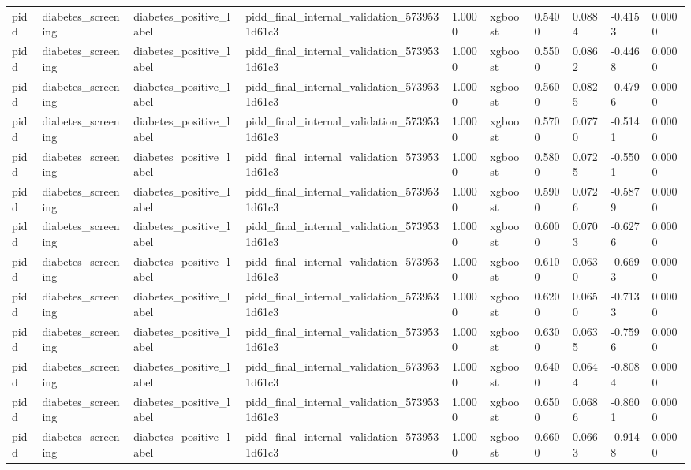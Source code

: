 \begin{tabular}{llllllllll}
pidd & diabetes\_screening & diabetes\_positive\_label & pidd\_final\_internal\_validation\_5739531d61c3 & 1.0000 & xgboost & 0.5400 & 0.0884 & -0.4153 & 0.0000 \\
pidd & diabetes\_screening & diabetes\_positive\_label & pidd\_final\_internal\_validation\_5739531d61c3 & 1.0000 & xgboost & 0.5500 & 0.0862 & -0.4468 & 0.0000 \\
pidd & diabetes\_screening & diabetes\_positive\_label & pidd\_final\_internal\_validation\_5739531d61c3 & 1.0000 & xgboost & 0.5600 & 0.0825 & -0.4796 & 0.0000 \\
pidd & diabetes\_screening & diabetes\_positive\_label & pidd\_final\_internal\_validation\_5739531d61c3 & 1.0000 & xgboost & 0.5700 & 0.0770 & -0.5141 & 0.0000 \\
pidd & diabetes\_screening & diabetes\_positive\_label & pidd\_final\_internal\_validation\_5739531d61c3 & 1.0000 & xgboost & 0.5800 & 0.0725 & -0.5501 & 0.0000 \\
pidd & diabetes\_screening & diabetes\_positive\_label & pidd\_final\_internal\_validation\_5739531d61c3 & 1.0000 & xgboost & 0.5900 & 0.0726 & -0.5879 & 0.0000 \\
pidd & diabetes\_screening & diabetes\_positive\_label & pidd\_final\_internal\_validation\_5739531d61c3 & 1.0000 & xgboost & 0.6000 & 0.0703 & -0.6276 & 0.0000 \\
pidd & diabetes\_screening & diabetes\_positive\_label & pidd\_final\_internal\_validation\_5739531d61c3 & 1.0000 & xgboost & 0.6100 & 0.0630 & -0.6693 & 0.0000 \\
pidd & diabetes\_screening & diabetes\_positive\_label & pidd\_final\_internal\_validation\_5739531d61c3 & 1.0000 & xgboost & 0.6200 & 0.0650 & -0.7133 & 0.0000 \\
pidd & diabetes\_screening & diabetes\_positive\_label & pidd\_final\_internal\_validation\_5739531d61c3 & 1.0000 & xgboost & 0.6300 & 0.0635 & -0.7596 & 0.0000 \\
pidd & diabetes\_screening & diabetes\_positive\_label & pidd\_final\_internal\_validation\_5739531d61c3 & 1.0000 & xgboost & 0.6400 & 0.0644 & -0.8084 & 0.0000 \\
pidd & diabetes\_screening & diabetes\_positive\_label & pidd\_final\_internal\_validation\_5739531d61c3 & 1.0000 & xgboost & 0.6500 & 0.0686 & -0.8601 & 0.0000 \\
pidd & diabetes\_screening & diabetes\_positive\_label & pidd\_final\_internal\_validation\_5739531d61c3 & 1.0000 & xgboost & 0.6600 & 0.0663 & -0.9148 & 0.0000 \\

\end{tabular}

